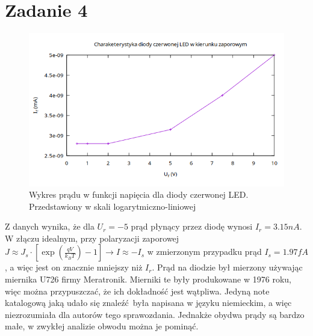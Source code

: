 \documentclass{article}
\begin{document}
\section{Zadanie 4}
\begin{figure}[h!]
\centering
  \includegraphics[scale=0.5]{./img/Z4.png}
  \caption{Wykres prądu w funkcji napięcia dla diody czerwonej LED. Przedstawiony w skali logarytmiczno-liniowej}
\end{figure}
\centering
Z danych wynika, że dla $U_r = -5$ prąd płynący przez diodę wynosi $I_r=3.15nA$.
W złączu idealnym, przy polaryzacji zaporowej $ J \approx J_s \cdot [\exp{(\frac{qV}{k_BT})}-1] \rightarrow 
I \approx -I_s$ w zmierzonym przypadku prąd $I_s=1.97fA$, a więc jest on znacznie mniejszy niż $I_r$. 
Prąd na diodzie był mierzony używając miernika U726 firmy Meratronik. Mierniki te były produkowane w 1976 roku,
więc można przypuszczać, że ich dokładność jest wątpliwa. Jedyną note katalogową jaką udało się znaleźć była
napisana w języku niemieckim, a więc niezrozumiała dla autorów tego sprawozdania.
Jednakże obydwa prądy są bardzo małe, w zwykłej analizie obwodu można je pominąć. 
\end{document}
